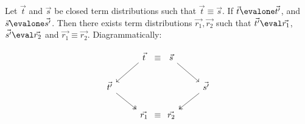 \begin{theorem}
  Let $\vec{t}$ and $\vec{s}$ be closed term distributions such that $\vec{t}\equiv\vec{s}$. If $\vec{t}\evalone\vec{t'}$, and $\vec{s}\evalone\vec{s'}$. Then there exists term distributions $\vec{r_1},\vec{r_2}$ such that $\vec{t'}\eval\vec{r_1}$, $\vec{s'}\eval\vec{r_2}$ and $\vec{r_1}\equiv\vec{r_2}$. Diagrammatically:

\[
  \begin{tikzcd}
   & \vec{t} \arrow[ld]&[-2.5em] \equiv &[-2.5em] \vec{s}\arrow[rd] &\\
   \vec{t'}\arrow[dr, twoheadrightarrow] & & & & \vec{s'}\arrow[ld, twoheadrightarrow] \\
   & \vec{r_1} & \equiv & \vec{r_2} &
  \end{tikzcd}
\]

\end{theorem}
